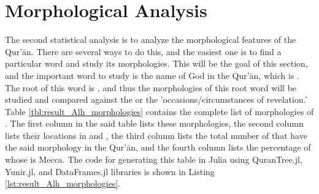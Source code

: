 \section{Morphological Analysis}\label{sec:result_morphological_analysis}
The second statistical analysis is to analyze the morphological features of the Qur'\=an. There are several ways to do this, and the easiest one is to find a particular word and study its morphologies. This will be the goal of this section, and the important word to study is the name of God in the Qur'\=an, which is  . The root of this word is  , and thus the morphologies of this root word will be studied and compared against the   or the 'occasions/circumstances of revelation.' Table \ref{tbl:result_Alh_morphologies} contains the complete list of morphologies of  . The first column in the said table lists these morphologies, the second column lists their locations in   and  , the third column lists the total number of   that have the said morphology in the Qur'\=an, and the fourth column lists the percentage of   whose   is Mecca. The code for generating this table in Julia using QuranTree.jl, Yunir.jl, and DataFrames.jl libraries is shown in Listing \ref{lst:result_Alh_morphologies}.

